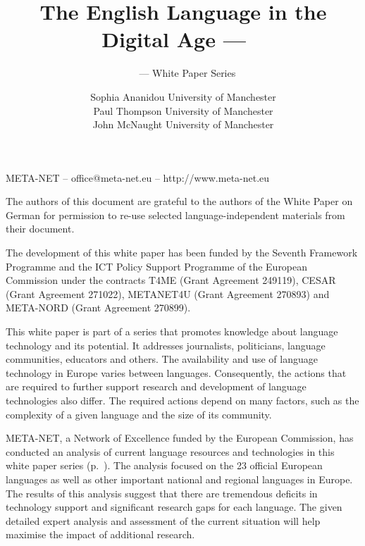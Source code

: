 \documentclass[]{../../metanetpaper}
\title{The English Language in the Digital Age --- ~}
\subtitle{~ --- White Paper Series}
\author{
  Sophia Ananidou {\small University of Manchester}\\
  Paul Thompson {\small University of Manchester}\\
  John McNaught {\small University of Manchester}
}
\begin{document}
\maketitle
\null
\pagestyle{empty} 

\centerline{META-NET -- office@meta-net.eu -- http://www.meta-net.eu}

\vfill



\begin{small}
  The authors of this document are grateful to the authors of the White Paper on German for permission to re-use selected language-independent materials from their document.  
\end{small}



\bigskip
\begin{small}
  The development of this white paper has been funded by the Seventh
  Framework Programme and the ICT Policy Support Programme of the
  European Commission under the contracts T4ME (Grant Agreement 249119),
  CESAR (Grant Agreement 271022), METANET4U (Grant Agreement 270893)
  and META-NORD (Grant Agreement 270899).
\end{small}

\clearpage

\setcounter{page}{5}
\pagestyle{scrheadings}

\cleardoublepage


This white paper is part of a series that promotes knowledge about language technology and its potential. It addresses journalists, politicians, language communities, educators and others. 
The availability and use of language technology in Europe varies between languages. Consequently, the actions that are required to further support research and development of language technologies also differ. The required actions depend on many factors, such as the complexity of a given language and the size of its community.

\bigskip
META-NET, a Network of Excellence funded by the European Commission, has conducted an  analysis of current language resources and technologies in this white paper series (p.~\pageref{whitepaperseries}). The analysis focused on the 23 official European languages as well as other important national and regional languages in Europe. The results of this analysis suggest that there are tremendous deficits in technology support and significant research gaps for each language. The given detailed expert analysis and assessment of the current situation will help maximise the impact of additional research.
\end{document}
